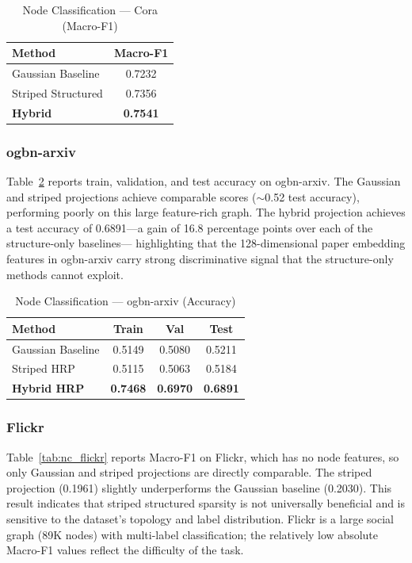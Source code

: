 \documentclass[conference]{IEEEtran}
\begin{document}
\begin{table}[ht]
\centering
\caption{Node Classification --- Cora (Macro-F1)}
\label{tab:nc_cora}
\begin{tabular}{lc}
\toprule
\textbf{Method} & \textbf{Macro-F1} \\
\midrule
Gaussian Baseline         & 0.7232 \\
Striped Structured        & 0.7356 \\
\textbf{Hybrid}           & \textbf{0.7541} \\
\bottomrule
\end{tabular}
\end{table}

\subsubsection{ogbn-arxiv}

Table~\ref{tab:nc_arxiv} reports train, validation, and test accuracy on
ogbn-arxiv. The Gaussian and striped projections achieve comparable scores
($\sim$0.52 test accuracy), performing poorly on this large feature-rich
graph. The hybrid projection achieves a test accuracy of 0.6891---a gain
of 16.8 percentage points over each of the structure-only baselines---
highlighting that the 128-dimensional paper embedding features in ogbn-arxiv
carry strong discriminative signal that the structure-only methods cannot
exploit.

\begin{table}[ht]
\centering
\caption{Node Classification --- ogbn-arxiv (Accuracy)}
\label{tab:nc_arxiv}
\begin{tabular}{lccc}
\toprule
\textbf{Method} & \textbf{Train} & \textbf{Val} & \textbf{Test} \\
\midrule
Gaussian Baseline   & 0.5149 & 0.5080 & 0.5211 \\
Striped HRP         & 0.5115 & 0.5063 & 0.5184 \\
\textbf{Hybrid HRP} & \textbf{0.7468} & \textbf{0.6970} & \textbf{0.6891} \\
\bottomrule
\end{tabular}
\end{table}

\subsubsection{Flickr}

Table~\ref{tab:nc_flickr} reports Macro-F1 on Flickr, which has no node
features, so only Gaussian and striped projections are directly comparable.
The striped projection (0.1961) slightly underperforms the Gaussian baseline
(0.2030). This result indicates that striped structured sparsity is not
universally beneficial and is sensitive to the dataset's topology and label
distribution. Flickr is a large social graph (89K nodes) with multi-label
classification; the relatively low absolute Macro-F1 values reflect the
difficulty of the task.
\end{document}
